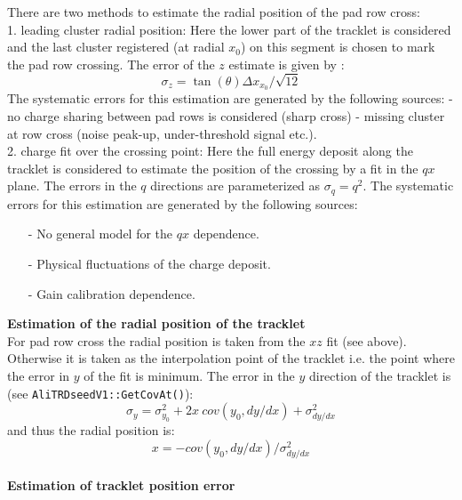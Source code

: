 \documentclass{alicetdr}
\begin{document}
There are two methods to estimate the radial position of the pad row cross:\\
1. leading cluster radial position: Here the lower part of the tracklet is
considered and the last cluster registered (at radial $x_{0}$) on this segment
is chosen to mark the pad row crossing. The error of the $z$ estimate is given by :
\begin{equation}
\sigma_{z} = \tan(\theta) \Delta x_{x_{0}}/\sqrt{12}
\end{equation}
The systematic errors for this estimation are generated by the following sources:
  - no charge sharing between pad rows is considered (sharp cross)
  - missing cluster at row cross (noise peak-up, under-threshold signal etc.).
\\
2. charge fit over the crossing point: Here the full energy deposit along
the tracklet is considered to estimate the position of the crossing by a fit
in the $qx$ plane. The errors in the $q$ directions are parameterized as
$\sigma_q = q^2$. The systematic errors for this estimation are generated by the
following sources:
\begin{itemize}
\item[-] No general model for the $qx$ dependence.
\item[-] Physical fluctuations of the charge deposit.
\item[-] Gain calibration dependence.
\end{itemize}

\noindent
{\bf Estimation of the radial position of the tracklet}\\

For pad row cross the radial position is taken from the $xz$ fit (see above).
Otherwise it is taken as the interpolation point of the tracklet i.e. the
point where the error in $y$ of the fit is minimum. The error in the $y$
direction of the tracklet is (see {\tt AliTRDseedV1::GetCovAt()}):
\begin{equation}
\sigma_{y} = \sigma^{2}_{y_{0}} + 2x\:cov(y_{0}, dy/dx) + \sigma^{2}_{dy/dx}
\end{equation}
and thus the radial position is:
\begin{equation}
x = - cov(y_{0}, dy/dx)/\sigma^{2}_{dy/dx}
\end{equation}
\\

\noindent
{\bf Estimation of tracklet position error}\\
\end{document}
